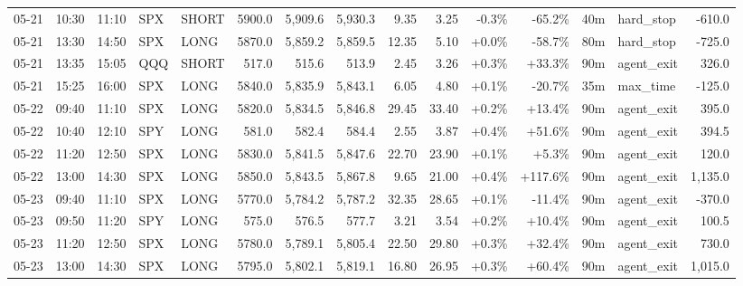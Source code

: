 \documentclass[11pt,a4paper,twoside]{article}
\begin{document}
\begin{landscape}
\begin{center}
\begin{longtable}{>{\color{txtmain}}l l l l l r r r r r r r r >{\color{txtmain}}l r}
05-21 & 10:30 & 11:10 & SPX & SHORT & 5900.0 & 5,909.6 & 5,930.3 & 9.35 & 3.25 & \textcolor{lossred}{-0.3\%} & \textcolor{lossred}{-65.2\%} & 40m & hard\_stop & \textcolor{lossred}{-610.0} \\
05-21 & 13:30 & 14:50 & SPX & LONG & 5870.0 & 5,859.2 & 5,859.5 & 12.35 & 5.10 & \textcolor{wingreen}{+0.0\%} & \textcolor{lossred}{-58.7\%} & 80m & hard\_stop & \textcolor{lossred}{-725.0} \\
05-21 & 13:35 & 15:05 & QQQ & SHORT & 517.0 & 515.6 & 513.9 & 2.45 & 3.26 & \textcolor{wingreen}{+0.3\%} & \textcolor{wingreen}{+33.3\%} & 90m & agent\_exit & \textcolor{wingreen}{326.0} \\
05-21 & 15:25 & 16:00 & SPX & LONG & 5840.0 & 5,835.9 & 5,843.1 & 6.05 & 4.80 & \textcolor{wingreen}{+0.1\%} & \textcolor{lossred}{-20.7\%} & 35m & max\_time & \textcolor{lossred}{-125.0} \\
05-22 & 09:40 & 11:10 & SPX & LONG & 5820.0 & 5,834.5 & 5,846.8 & 29.45 & 33.40 & \textcolor{wingreen}{+0.2\%} & \textcolor{wingreen}{+13.4\%} & 90m & agent\_exit & \textcolor{wingreen}{395.0} \\
05-22 & 10:40 & 12:10 & SPY & LONG & 581.0 & 582.4 & 584.4 & 2.55 & 3.87 & \textcolor{wingreen}{+0.4\%} & \textcolor{wingreen}{+51.6\%} & 90m & agent\_exit & \textcolor{wingreen}{394.5} \\
05-22 & 11:20 & 12:50 & SPX & LONG & 5830.0 & 5,841.5 & 5,847.6 & 22.70 & 23.90 & \textcolor{wingreen}{+0.1\%} & \textcolor{wingreen}{+5.3\%} & 90m & agent\_exit & \textcolor{wingreen}{120.0} \\
05-22 & 13:00 & 14:30 & SPX & LONG & 5850.0 & 5,843.5 & 5,867.8 & 9.65 & 21.00 & \textcolor{wingreen}{+0.4\%} & \textcolor{wingreen}{+117.6\%} & 90m & agent\_exit & \textcolor{wingreen}{1,135.0} \\
05-23 & 09:40 & 11:10 & SPX & LONG & 5770.0 & 5,784.2 & 5,787.2 & 32.35 & 28.65 & \textcolor{wingreen}{+0.1\%} & \textcolor{lossred}{-11.4\%} & 90m & agent\_exit & \textcolor{lossred}{-370.0} \\
05-23 & 09:50 & 11:20 & SPY & LONG & 575.0 & 576.5 & 577.7 & 3.21 & 3.54 & \textcolor{wingreen}{+0.2\%} & \textcolor{wingreen}{+10.4\%} & 90m & agent\_exit & \textcolor{wingreen}{100.5} \\
05-23 & 11:20 & 12:50 & SPX & LONG & 5780.0 & 5,789.1 & 5,805.4 & 22.50 & 29.80 & \textcolor{wingreen}{+0.3\%} & \textcolor{wingreen}{+32.4\%} & 90m & agent\_exit & \textcolor{wingreen}{730.0} \\
05-23 & 13:00 & 14:30 & SPX & LONG & 5795.0 & 5,802.1 & 5,819.1 & 16.80 & 26.95 & \textcolor{wingreen}{+0.3\%} & \textcolor{wingreen}{+60.4\%} & 90m & agent\_exit & \textcolor{wingreen}{1,015.0} \\

\end{longtable}
\end{center}
\end{landscape}
\end{document}
